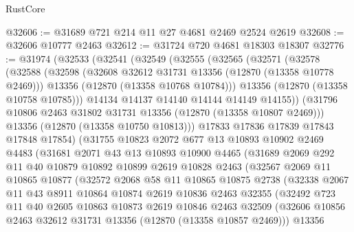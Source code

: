 \begin{lexlean}{RustCore}
\begin{coremodule}
@32606 := @31689 @721 @214 @11 @27 @4681 @2469 @2524 @2619
@32608 := @32606 @10777 @2463
@32612 := @31724 @720 @4681 @18303 @18307
@32776 := @31974
    (@32533
      (@32541
        (@32549
          (@32555
            (@32565
              (@32571
                (@32578
                  (@32588
                    (@32598
                      (@32608 @32612 @31731 @13356 (@12870 (@13358 @10778 @2469)))
                      @13356
                      (@12870 (@13358 @10768 @10784)))
                    @13356
                    (@12870 (@13358 @10758 @10785)))
                  @14134
                  @14137
                  @14140
                  @14144
                  @14149
                  @14155))
              (@31796 @10806 @2463 @31802 @31731 @13356 (@12870 (@13358 @10807 @2469)))
              @13356
              (@12870 (@13358 @10750 @10813)))
            @17833
            @17836
            @17839
            @17843
            @17848
            @17854)
          (@31755
            @10823
            @2072
            @677
            @13
            @10893
            @10902
            @2469
            @4483
            (@31681
              @2071
              @43
              @13
              @10893
              @10900
              @4465
              (@31689
                @2069
                @292
                @11
                @40
                @10879
                @10892
                @10899
                @2619
                @10828
                @2463
                (@32567
                  @2069
                  @11
                  @10865
                  @10877
                  (@32572
                    @2068
                    @58
                    @11
                    @10865
                    @10875
                    @2738
                    (@32338
                      @2067
                      @11
                      @43
                      @8911
                      @10864
                      @10874
                      @2619
                      @10836
                      @2463
                      @32355
                      (@32492
                        @723
                        @11
                        @40
                        @2605
                        @10863
                        @10873
                        @2619
                        @10846
                        @2463
                        @32509
                        (@32606 @10856 @2463 @32612 @31731 @13356 (@12870 (@13358 @10857 @2469)))
                        @13356

\end{coremodule}
\end{lexlean}
